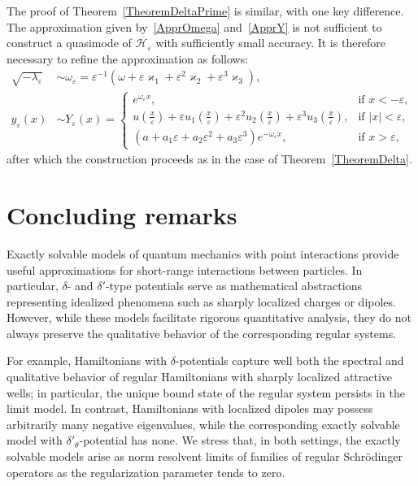 \documentclass[reqno]{amsart}
\theoremstyle{definition}
\theoremstyle{remark}
\numberwithin{equation}{section}
\renewcommand{\kappa}{\varkappa}
\newcommand{\eps}{\varepsilon}
\newcommand{\cH}{\mathcal{H}}
\newcommand\xe{\left(\tfrac x\eps\right)}
\begin{document}
The proof of Theorem~\ref{TheoremDeltaPrime} is similar, with one key difference. The approximation given by~\eqref{ApprOmega} and~\eqref{ApprY} is not sufficient to construct a quasimode of $\cH_\eps$ with sufficiently small accuracy. It is therefore necessary to refine the approximation as follows:
\begin{align*}
\sqrt{-\lambda_\eps} &\sim \omega_\eps = \eps^{-1}(\omega + \eps\kappa_1 + \eps^2\kappa_2 + \eps^3\kappa_3), \\
y_\eps(x) &\sim Y_\eps(x) =
  \begin{cases}
    e^{\omega_\eps x}, & \text{if } x < -\eps, \\
    u\xe + \eps u_1 \xe + \eps^2 u_2 \xe + \eps^3 u_3 \xe, & \text{if } |x| < \eps, \\
    (a + a_1\eps + a_2\eps^2 + a_3\eps^3)e^{-\omega_\eps x}, & \text{if } x > \eps,
  \end{cases}
\end{align*}
after which the construction proceeds as in the case of Theorem~\ref{TheoremDelta}.



\section{Concluding remarks}


Exactly solvable models of quantum mechanics with point interactions provide useful approximations for short-range interactions between particles. In particular, $\delta$- and $\delta'$-type potentials serve as mathematical abstractions representing idealized phenomena such as sharply localized charges or dipoles. However, while these models facilitate rigorous quantitative analysis, they do not always preserve the qualitative behavior of the corresponding regular systems.


For example, Hamiltonians with $\delta$-potentials capture well both the spectral and qualitative behavior of regular Hamiltonians with sharply localized attractive wells; in particular, the unique bound state of the regular system persists in the limit model. In contrast, Hamiltonians with localized dipoles may possess arbitrarily many negative eigenvalues, while the corresponding exactly solvable model with $\delta'_\theta$-potential has none. We stress that, in both settings, the exactly solvable models arise as norm resolvent limits of families of regular Schrödinger operators as the regularization parameter tends to zero.
\end{document}
